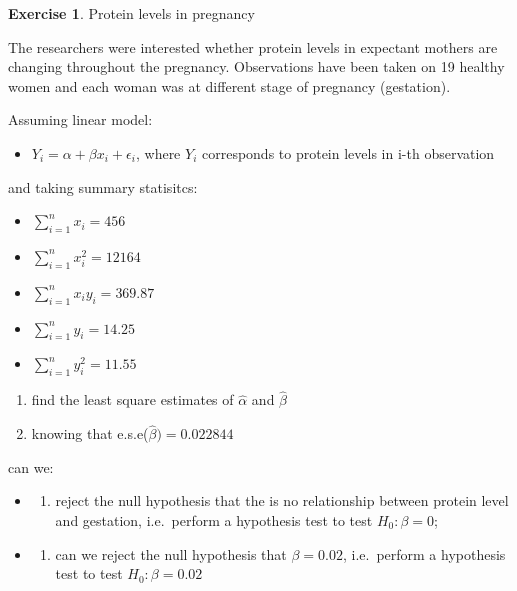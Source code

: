 \documentclass[
]{book}
\providecommand{\tightlist}{%
  \setlength{\itemsep}{0pt}\setlength{\parskip}{0pt}}
\theoremstyle{definition}
\theoremstyle{definition}
\theoremstyle{definition}
\newtheorem{exercise}{Exercise}[chapter]
\theoremstyle{remark}
\begin{document}
\begin{exercise}
\protect\hypertarget{exr:lm-protein}{}{\label{exr:lm-protein} }Protein levels in pregnancy

The researchers were interested whether protein levels in expectant mothers are changing throughout the pregnancy. Observations have been taken on 19 healthy women and each woman was at different stage of pregnancy (gestation).

Assuming linear model:

\begin{itemize}
\tightlist
\item
  \(Y_i = \alpha + \beta x_i + \epsilon_i\), where \(Y_i\) corresponds to protein levels in i-th observation
\end{itemize}

and taking summary statisitcs:

\begin{itemize}
\tightlist
\item
  \(\sum_{i=1}^{n}x_i = 456\)
\item
  \(\sum_{i=1}^{n}x_i^2 = 12164\)
\item
  \(\sum_{i=1}^{n}x_iy_i = 369.87\)
\item
  \(\sum_{i=1}^{n}y_i = 14.25\)
\item
  \(\sum_{i=1}^{n}y_i^2 = 11.55\)
\end{itemize}

\begin{enumerate}
\def\labelenumi{\alph{enumi})}
\tightlist
\item
  find the least square estimates of \(\hat{\alpha}\) and \(\hat{\beta}\)
\item
  knowing that e.s.e(\(\hat{\beta}) = 0.022844\)
\end{enumerate}

can we:

\begin{itemize}
\item
  \begin{enumerate}
  \def\labelenumi{\roman{enumi})}
  \tightlist
  \item
    reject the null hypothesis that the is no relationship between protein level and gestation, i.e.~perform a hypothesis test to test \(H_0:\beta = 0\);
  \end{enumerate}
\item
  \begin{enumerate}
  \def\labelenumi{\roman{enumi})}
  \setcounter{enumi}{1}
  \tightlist
  \item
    can we reject the null hypothesis that \(\beta = 0.02\), i.e.~perform a hypothesis test to test \(H_0:\beta = 0.02\)
  \end{enumerate}
\end{itemize}


\end{exercise}
\end{document}
